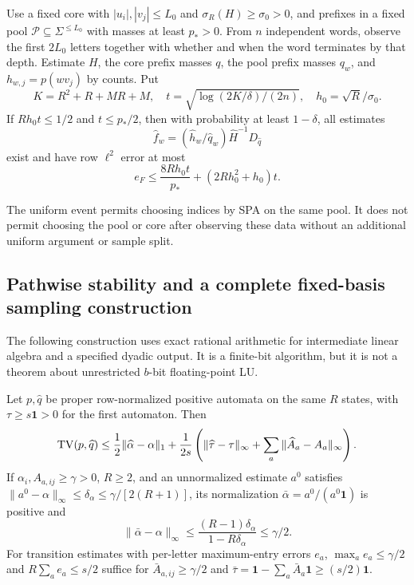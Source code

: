 \begin{proposition}
\label{II:U:prop:pool-estimation}
Use a fixed core with $|u_i|,|v_j|\le L_0$ and
$\sigma_R(H)\ge\sigma_0>0$, and prefixes in a fixed
pool $\mathcal P\subseteq\Sigma^{\le L_0}$ with masses at least $p_*>0$.
From $n$ independent words, observe the first $2L_0$ letters together
with whether and when the word terminates by that depth. Estimate
$H$, the core prefix masses $q$, the pool prefix masses $q_w$, and
$h_{w,j}=p(wv_j)$ by counts. Put
\[
 K=R^2+R+MR+M,\quad
 t=\sqrt{\log(2K/\delta)/(2n)},\quad h_0=\sqrt R/\sigma_0.
\]
If $Rh_0t\le1/2$ and $t\le p_*/2$, then with probability at least
$1-\delta$, all estimates
\[
 \widehat f_w=(\widehat h_w/\widehat q_w)\widehat H^{-1}D_{\widehat q}
\]
exist and have row $\ell^2$ error at most
\begin{equation}
 e_F\le\frac{8Rh_0t}{p_*}+(2Rh_0^2+h_0)t.
 \label{II:U:eq:pool-estimation}
\end{equation}
\end{proposition}

The uniform event permits choosing indices by SPA on the same pool.
It does not permit choosing the pool or core after observing these
data without an additional uniform argument or sample split.

\subsection{Pathwise stability and a complete fixed-basis sampling construction}
\label{II:U:sec:fixed-basis-sampling}
The following construction uses exact rational arithmetic for intermediate
linear algebra and a specified dyadic output. It is a finite-bit algorithm,
but it is not a theorem about unrestricted $b$-bit floating-point LU.

\begin{proposition}
\label{II:U:prop:pathwise-stability}
Let $p,\widehat q$ be proper row-normalized positive automata on the same
$R$ states, with $\tau\ge s\mathbf1>0$ for the first automaton. Then
\begin{equation}
 \operatorname{TV}(p,\widehat q)\le\frac12\|\widehat\alpha-\alpha\|_1
 +\frac1{2s}\left(\|\widehat\tau-\tau\|_\infty+
                   \sum_a\|\widehat A_a-A_a\|_\infty\right).
 \label{II:U:eq:pathwise-general}
\end{equation}
If $\alpha_i,A_{a,ij}\ge\gamma>0$, $R\ge2$, and an unnormalized
estimate $a^0$ satisfies $\|a^0-\alpha\|_\infty\le\delta_\alpha
\le\gamma/[2(R+1)]$, its normalization $\bar\alpha=a^0/(a^0\mathbf1)$
is positive and
\begin{equation}
 \|\bar\alpha-\alpha\|_\infty
 \le\frac{(R-1)\delta_\alpha}{1-R\delta_\alpha}\le\gamma/2.
 \label{II:U:eq:initial-normalization}
\end{equation}
For transition estimates with per-letter maximum-entry errors $e_a$,
$\max_a e_a\le\gamma/2$ and $R\sum_a e_a\le s/2$ suffice for
$\bar A_{a,ij}\ge\gamma/2$ and
$\bar\tau=\mathbf1-\sum_a\bar A_a\mathbf1\ge(s/2)\mathbf1$.
\end{proposition}


